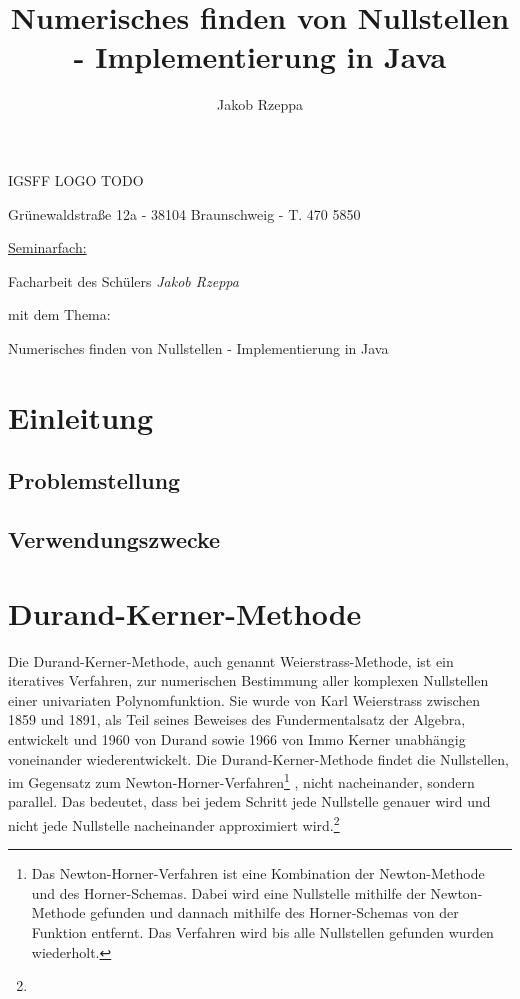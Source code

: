\documentclass[12pt]{article}
\title{Numerisches finden von Nullstellen - Implementierung in Java}
\author{Jakob Rzeppa}
\begin{document}
\begin{titlepage}
	\centering
    {\huge IGSFF LOGO TODO\par}
	{Grünewaldstraße 12a - 38104 Braunschweig - T. 470 5850\par}
	\vspace{1cm}
	{\underline{Seminarfach:}\par}
	\vspace{1cm}
    {\large Facharbeit des Schülers \textit{Jakob Rzeppa} \par mit dem Thema: \par}
    \vspace{1.5cm}
	{\huge Numerisches finden von Nullstellen - Implementierung in Java\par}
	\vspace{2cm}
\end{titlepage}

\tableofcontents

\section{Einleitung}

\subsection{Problemstellung}

\subsection{Verwendungszwecke}


\section{Durand-Kerner-Methode}
Die Durand-Kerner-Methode, auch genannt Weierstrass-Methode, ist ein iteratives Verfahren, zur numerischen Bestimmung aller komplexen Nullstellen einer univariaten Polynomfunktion.
Sie wurde von Karl Weierstrass zwischen 1859 und 1891, als Teil seines Beweises des Fundermentalsatz der Algebra, entwickelt und 1960 von Durand sowie 1966 von Immo Kerner unabhängig voneinander wiederentwickelt.
Die Durand-Kerner-Methode findet die Nullstellen, im Gegensatz zum Newton-Horner-Verfahren\footnote{
    Das Newton-Horner-Verfahren ist eine Kombination der Newton-Methode und des Horner-Schemas. Dabei wird eine Nullstelle mithilfe der Newton-Methode gefunden und dannach mithilfe des Horner-Schemas von der Funktion entfernt. Das Verfahren wird bis alle Nullstellen gefunden wurden wiederholt.
}
, nicht nacheinander, sondern parallel. Das bedeutet, dass bei jedem Schritt jede Nullstelle genauer wird und nicht jede Nullstelle nacheinander approximiert wird.\footnote{

}
\end{document}

